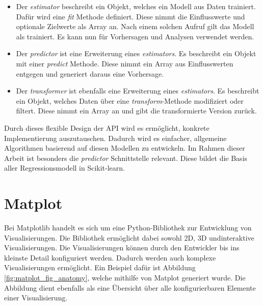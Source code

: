 \begin{itemize}
\item Der \emph{estimator} beschreibt ein Objekt, welches ein Modell aus Daten trainiert. Dafür wird eine \emph{fit} Methode definiert. Diese nimmt die Einflusswerte und optionale Zielwerte als Array an. Nach einem solchen Aufruf gilt das Modell als trainiert. Es kann nun für Vorhersagen und Analysen verwendet werden.
\item Der \emph{predictor} ist eine Erweiterung eines \emph{estimators}. Es beschreibt ein Objekt mit einer \emph{predict} Methode. Diese nimmt ein Array aus Einflusswerten entgegen und generiert daraus eine Vorhersage.
\item Der \emph{transformer} ist ebenfalls eine Erweiterung eines \emph{estimators}. Es beschreibt ein Objekt, welches Daten über eine \emph{transform}-Methode modifiziert oder filtert. Diese nimmt ein Array an und gibt die transformierte Version zurück.
\end{itemize}

\noindent Durch dieses flexible Design der API wird es ermöglicht, konkrete Implementierung auszutauschen. Dadurch wird es einfacher, allgemeine Algorithmen basierend auf diesen Modellen zu entwickeln. Im Rahmen dieser Arbeit ist besonders die \emph{predictor} Schnittstelle relevant. Diese bildet die Basis aller Regressionsmodell in Scikit-learn.

\section{Matplot}
\label{sec:matplot}

Bei Matplotlib \parencite{Matplot} handelt es sich um eine Python-Bibliothek zur Entwicklung von Visualisierungen. Die Bibliothek ermöglicht dabei sowohl 2D, 3D und\linebreak interaktive Visualisierungen. Die Visualisierungen können durch den Entwickler bis ins kleinste Detail konfiguriert werden. Dadurch werden auch komplexe Visualisierungen ermöglicht. Ein Beispiel dafür ist Abbildung \ref{fig:matplot_fig_anatomy}, welche mithilfe von Matplot generiert wurde. Die Abbildung dient ebenfalls als eine Übersicht über alle konfigurierbaren Elemente einer Visualisierung.

